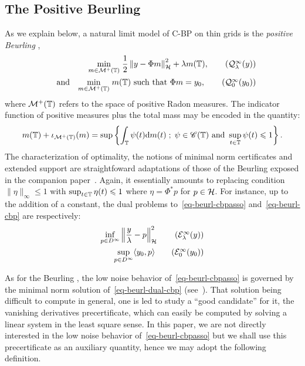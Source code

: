 \subsection{The Positive Beurling \protect\lasso}
As we explain below, a natural limit model of C-BP on thin grids is the \textit{positive Beurling \lasso},
\begin{align}
  	\umin{m\in \Mm^+(\TT)} \frac{1}{2}\normH{y-\Phi m}^2 + \la m(\TT), 
	\tag{$\Qq_\la^\infty(y)$}\label{eq-beurl-cbpasso}\\
 	\qandq
	\umin{m\in \Mm^+(\TT)} m(\TT) \mbox{ such that } \Phi m=y_0,  \tag{$\Qq_0^\infty(y_0)$}\label{eq-beurl-cbp}
\end{align}
where $\mathcal{M}^+(\mathbb{T})$ refers to the space of positive Radon measures. The indicator function of positive measures plus the total mass may be encoded in the quantity:
\begin{align}
  m(\mathbb{T})+ \iota_{\mathcal{M}^+(\mathbb{T})}(m)=\sup\left\{ \int_{\mathbb{T}} \psi(t)\mathrm{d} m(t) \;;\; \psi\in \mathscr{C}(\mathbb{T})\mbox{ and } \sup_{t\in\mathbb{T}} \psi(t)\leqslant 1 \right\}.
\end{align}
The characterization of optimality, the notions of minimal norm certificates and extended support are straightfoward adaptations of those of the Beurling \lasso exposed in the companion paper~\cite[Section 3]{2016-duval-thinlasso}.
Again, it essentially amounts to replacing condition $\|\eta\|_{\infty}\leq 1$ with $\sup_{t\in\mathbb{T}} \eta(t)\leqslant 1$ where $\eta=\Phi^*p$ for $p\in \mathcal{H}$.
For instance, up to the addition of a constant, the dual problems to~\eqref{eq-beurl-cbpasso} and~\eqref{eq-beurl-cbp} are respectively:
\begin{align}
  \inf_{p\in D^\infty} \normH{\frac{y}{\la}-p}^2 \tag{$\Ee_\la^\infty(y)$}\label{eq-beurl-dual-cbpasso}\\
  \sup_{p\in D^\infty} \langle y_0, p\rangle \tag{$\Ee_0^\infty(y_0)$}\label{eq-beurl-dual-cbp}
\end{align}

As for the Beurling \lasso, the low noise behavior of~\eqref{eq-beurl-cbpasso} is governed by the minimal norm solution of~\eqref{eq-beurl-dual-cbp} (see~\cite[Section 3]{2016-duval-thinlasso}). That solution being difficult to compute in general, one is led to study a ``good candidate'' for it, the vanishing derivatives precertificate, which can easily be computed by solving a linear system in the least square sense. In this paper, we are not directly interested in the low noise behavior of~\eqref{eq-beurl-cbpasso} but we shall use this precertificate as an auxiliary quantity, hence we may adopt the following definition. 

